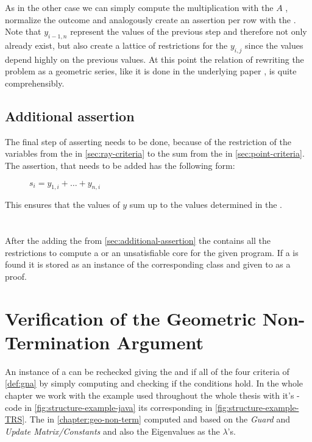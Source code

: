 As in the other case we can simply compute the multiplication with the \updatematrix $A$ , normalize the outcome and analogously create an assertion per row with the \smtfactory. \newline
Note that $y_{i-1,n}$ represent the values of the previous step and therefore not only already exist, but also create a lattice of restrictions for the $y_{i,j}$ since the values depend highly on the previous values. At this point the relation of rewriting the problem as a geometric series, like it is done in the underlying paper \cite{leike2014geometric}, is quite comprehensibly.

\subsection{Additional assertion}
\label{sec:additional-assertion}
The final step of asserting needs to be done, because of the restriction of the variables from the \rayc in \autoref{sec:ray-criteria} to the sum from the \pointc in \autoref{sec:point-criteria}.\newline
The assertion, that needs to be added has the following form:
\begin{figure}[H]
	\centering
	$s_i = y_{1,i}+ \dots + y_{n,i}$
\end{figure}
This ensures that the values of $y$ sum up to the values determined in the \pointc.
\\
\\
\\
After the adding the \addass from \autoref{sec:additional-assertion} the \solver contains all the restrictions to compute a \gna or an unsatisfiable core for the given program.\newline
If a \gna is found it is stored as an instance of the corresponding class and given to \aprove as a proof.

\section{Verification of the Geometric Non-Termination Argument}
\label{sec:verification-of-gna}
An instance of a \gna can be rechecked giving the \iterationmatrix and \iterationconstants if all of the four criteria of \autoref{def:gna} by simply computing and checking if the conditions hold.
In the whole chapter we work with the example used throughout the whole thesis with it's -code in \autoref{fig:structure-example-java} its corresponding \its in \autoref{fig:structure-example-TRS}. The in \autoref{chapter:geo-non-term} computed \iterationmatrix and \iterationconstants based on the \textit{Guard} and \textit{Update Matrix/Constants} and also the Eigenvalues as the $\lambda$'s. \newline

